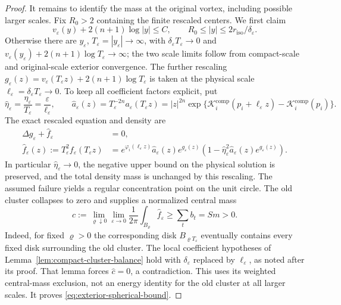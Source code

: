 \documentclass[11pt,reqno]{amsart}
\numberwithin{equation}{section}
\theoremstyle{definition}
\theoremstyle{remark}
\newcommand{\eps}{\varepsilon}
\newcommand{\etae}{\eta_{\eps}}
\newcommand{\de}{\delta_{\eps}}
\newcommand{\comp}{\mathrm{comp}}
\begin{document}
\begin{proof}
It remains to identify the mass at the original vortex, including
possible larger scales. Fix $R_0>2$ containing the finite rescaled
centers. We first claim
\begin{equation}\label{eq:exterior-spherical-bound}
 v_\eps(y)+2(n+1)\log|y|\le C,
 \qquad R_0\le|y|\le2r_{\mathrm{iso}}/\de.
\end{equation}
Otherwise there are $y_\eps$, $T_\eps=|y_\eps|\to\infty$, with
$\de T_\eps\to0$ and
$v_\eps(y_\eps)+2(n+1)\log T_\eps\to\infty$; the two scale
limits follow from compact-scale and original-scale exterior
convergence. The further rescaling
\(g_\eps(z)=v_\eps(T_\eps z)+2(n+1)\log T_\eps\)
is taken at the physical scale $\ell_\eps=\de T_\eps\to0$.
To keep all coefficient factors explicit, put
\[
 \widehat\eta_\eps=\frac{\etae}{T_\eps}=\frac{\eps}{\ell_\eps},
 \qquad
 \widehat a_\eps(z)=T_\eps^{-2n}a_\eps(T_\eps z)
 =|z|^{2n}\exp\{\mathcal K_i^{\comp}(p_i+\ell_\eps z)
                         -\mathcal K_i^{\comp}(p_i)\}.
\]
The exact rescaled equation and density are
\begin{equation}\label{eq:exterior-rescaled-equation}
 \begin{split}
 \Delta g_\eps+\widehat f_\eps&=0,\\
 \widehat f_\eps(z):=T_\eps^2f_\eps(T_\eps z)
 &=e^{\varphi_i(\ell_\eps z)}\widehat a_\eps(z)e^{g_\eps(z)}
           (1-\widehat\eta_\eps^2\widehat a_\eps(z)e^{g_\eps(z)}).
 \end{split}
\end{equation}
In particular $\widehat\eta_\eps\to0$, the negative upper bound
on the physical solution is preserved, and the total density
mass is unchanged by this rescaling. The assumed failure yields
a regular concentration point on the unit circle. The old
cluster collapses to zero and supplies a normalized central mass
\[
 \widehat c:=\lim_{\varrho\downarrow0}\lim_{\eps\to0}
       \frac1{2\pi}\int_{B_\varrho}\widehat f_\eps
       \ge\sum_t b_t=Sm>0.
\]
Indeed, for fixed $\varrho>0$ the corresponding disk
$B_{\varrho T_\eps}$ eventually contains every fixed disk
surrounding the old cluster. The local coefficient hypotheses of
Lemma~\ref{lem:compact-cluster-balance} hold with $\de$ replaced
by $\ell_\eps$, as noted after its proof. That lemma forces
$\widehat c=0$, a contradiction. This uses its weighted
central-mass exclusion, not an energy identity for the old
cluster at all larger scales. It proves
\eqref{eq:exterior-spherical-bound}.


\end{proof}
\end{document}
